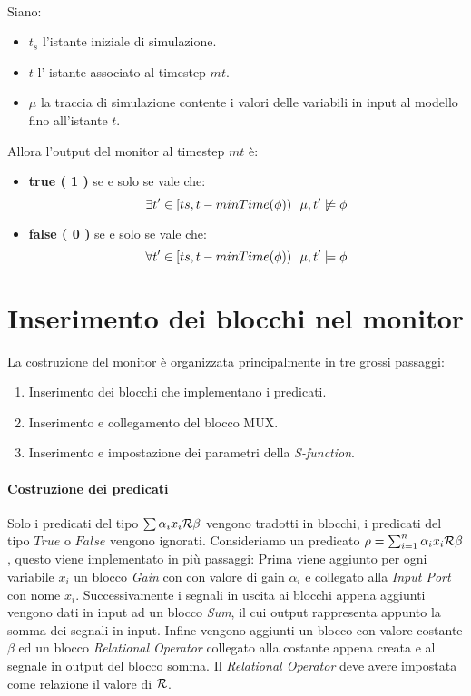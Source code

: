 \documentclass[10pt,a4paper]{article}
\newcommand{\SFunction}{\emph{S-function}}
\newcommand{\Iport}{\emph{Input Port}}
\newcommand{\Gain}{\emph{Gain}}
\newcommand{\Sum}{\emph{Sum}}
\newcommand{\RelOp}{\emph{Relational Operator}}
\begin{document}
	\paragraph{}
	Siano:
	\begin{itemize}
		\item $t_s$ l'istante iniziale di simulazione.
		\item $t$ l' istante associato al timestep $mt$.
		\item $\mu$ la traccia di simulazione contente i valori delle variabili in input al modello fino all'istante $t$.
	\end{itemize}
	Allora l'output del monitor al timestep $mt$ è:
	\begin{itemize}
		\item [] \textbf{ true ( 1 )} se e solo se vale che:
		$$
		\exists t'\in[ts,t -minTime(\phi))\text{\space\space} \mu,t'\not\models \phi
		$$
		
		\item [] \textbf{false ( 0 )} se e solo se vale che:
		$$
		\forall t'\in[ts,t -minTime(\phi))\text{\space\space} \mu,t'\models \phi
		$$
	\end{itemize}



	\section{Inserimento dei blocchi nel monitor}
	La costruzione del monitor è organizzata principalmente in tre grossi passaggi:
	\begin{enumerate}
		\item Inserimento dei blocchi che implementano i predicati.
		\item Inserimento e collegamento del blocco MUX.
		\item Inserimento e impostazione dei parametri della \SFunction{}.
	\end{enumerate}
	\paragraph{Costruzione dei predicati}
	Solo i predicati del tipo $\sum \alpha_i x_i \mathcal{R} \beta$ vengono tradotti in blocchi, i predicati del tipo $True$ o $False$ vengono ignorati.
	Consideriamo un predicato $\rho=\sum_{i=1}^{n} \alpha_i x_i  \mathcal{R} \beta$, questo viene implementato in più passaggi:
	Prima viene aggiunto per ogni variabile $x_i$ un blocco \Gain{} con  con valore di gain $\alpha_i$ e collegato alla \Iport{} con nome $x_i$. Successivamente i segnali in uscita ai blocchi appena aggiunti vengono dati in input ad un blocco \Sum, il cui output rappresenta appunto la somma dei segnali in input. Infine vengono aggiunti un blocco con valore costante $\beta$ ed un blocco \RelOp{} collegato alla costante appena creata e al segnale in output del blocco somma. Il \RelOp{}  deve avere impostata come relazione il valore di $\mathcal{R}$.
	
\end{document}
